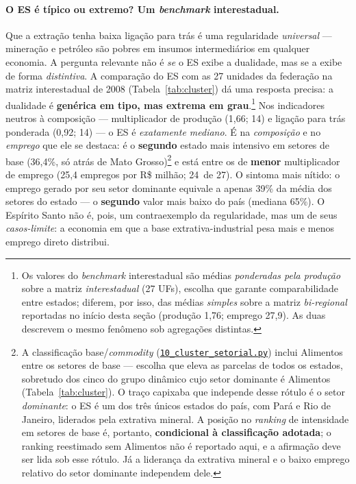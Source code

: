 \documentclass[11pt,a4paper]{article}
\begin{document}
\paragraph{O ES é típico ou extremo? Um \emph{benchmark} interestadual.}
Que a extração tenha baixa ligação para trás é uma regularidade \emph{universal} ---
mineração e petróleo são pobres em insumos intermediários em qualquer economia. A pergunta
relevante não é \emph{se} o ES exibe a dualidade, mas se a exibe de forma \emph{distintiva}.
A comparação do ES com as 27 unidades da federação na matriz interestadual de 2008
(Tabela~\ref{tab:cluster}) dá uma resposta precisa: a dualidade é \textbf{genérica em tipo, mas
extrema em grau}.\footnote{Os valores do \emph{benchmark} interestadual são médias
\emph{ponderadas pela produção} sobre a matriz \emph{interestadual} (27 UFs), escolha que
garante comparabilidade entre estados; diferem, por isso, das médias \emph{simples} sobre a
matriz \emph{bi-regional} reportadas no início desta seção (produção 1,76; emprego 27,9). As
duas descrevem o mesmo fenômeno sob agregações distintas.} Nos indicadores neutros à
composição --- multiplicador de produção (1,66; 14\textordmasculine) e ligação para trás
ponderada (0,92; 14\textordmasculine) --- o ES é \emph{exatamente mediano}. É na
\emph{composição} e no \emph{emprego} que ele se destaca: é o \textbf{segundo} estado mais
intensivo em setores de base (36,4\%, só atrás de Mato Grosso)\footnote{A classificação
base/\emph{commodity}
(\href{https://github.com/fcarva/es-insumo-produto/blob/116a350/pesquisa/10_cluster_setorial.py}{\texttt{10\_cluster\_setorial.py}})
inclui Alimentos entre os setores de base --- escolha que eleva as parcelas de todos os
estados, sobretudo dos cinco do grupo dinâmico cujo setor dominante é Alimentos
(Tabela~\ref{tab:cluster}). O traço capixaba que independe desse rótulo é o setor
\emph{dominante}: o ES é um dos três únicos estados do país, com Pará e Rio de Janeiro,
liderados pela extrativa mineral. A posição no \emph{ranking} de intensidade em setores de base
é, portanto, \textbf{condicional à classificação adotada}; o ranking reestimado sem Alimentos
não é reportado aqui, e a afirmação deve ser lida sob esse rótulo. Já a liderança da extrativa
mineral e o baixo emprego relativo do setor dominante independem dele.}
e está entre os de \textbf{menor} multiplicador de emprego (25,4 empregos por R\$ milhão;
24\textordmasculine\ de 27). O sintoma mais nítido: o emprego gerado por seu setor dominante
equivale a apenas 39\% da média dos setores do estado --- o \textbf{segundo} valor mais baixo
do país (mediana 65\%). O Espírito Santo não é, pois, um contraexemplo da regularidade, mas um
de seus \emph{casos-limite}: a economia em que a base extrativa-industrial pesa mais e menos
emprego direto distribui.
\end{document}
